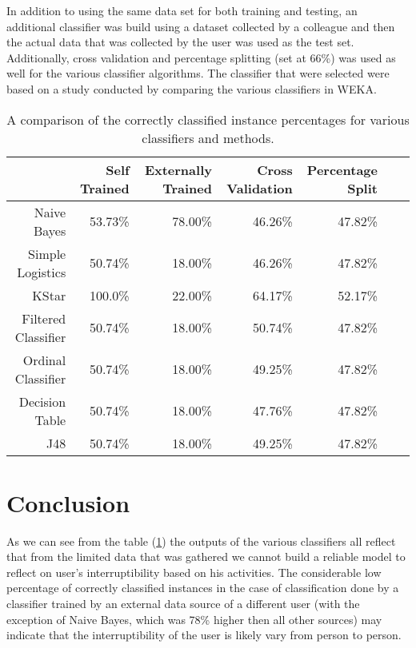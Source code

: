 \documentclass[10pt,a4paper]{article}
\begin{document}
In addition to using the same data set for both training and testing, an additional classifier was build using a dataset collected by a colleague and then the actual data that was collected by the user was used as the test set. Additionally, cross validation and percentage splitting (set at 66\%) was used as well for the various classifier algorithms. The classifier that were selected were based on a study conducted by \cite{kumari2013selection} comparing the various classifiers in WEKA.
\newline
\newline
\noindent
\begin{table}[htdp]
\begin{tabular*}{\columnwidth}{@{\extracolsep{\stretch{1}}}*{7}{r}@{}}
  \toprule
  & \textbf{Self Trained} & \textbf{Externally Trained} & \textbf{Cross Validation} & \textbf{Percentage Split} \\
  \midrule
  Naive Bayes           & 53.73\% & 78.00\% & 46.26\% & 47.82\%  \\
  Simple Logistics      & 50.74\% & 18.00\% & 46.26\% & 47.82\%  \\
  KStar                 & 100.0\% & 22.00\% & 64.17\% & 52.17\%  \\
  Filtered Classifier   & 50.74\% & 18.00\% & 50.74\% & 47.82\%  \\
  Ordinal Classifier    & 50.74\% & 18.00\% & 49.25\% & 47.82\%  \\
  Decision Table        & 50.74\% & 18.00\% & 47.76\% & 47.82\%  \\
  J48                   & 50.74\% & 18.00\% & 49.25\% & 47.82\%  \\
  \bottomrule                           
\end{tabular*}
    \caption{A comparison of the correctly classified instance percentages for various classifiers and methods.}
    \label{classifier comparison}
\end{table}

\section{Conclusion}
As we can see from the table (\ref{classifier comparison}) the outputs of the various classifiers all reflect that from the limited data that was gathered we cannot build a reliable model to reflect on user's interruptibility based on his activities. The considerable low percentage of correctly classified instances in the case of classification done by a classifier trained by an external data source of a different user (with the exception of Naive Bayes, which was 78\% higher then all other sources) may indicate that the interruptibility of the user is likely vary from person to person.
\end{document}

